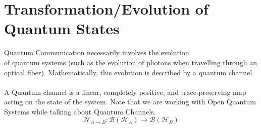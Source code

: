 \documentclass{article}
\begin{document}
\section{Transformation/Evolution of Quantum States}

Quantum Communication necessarily involves the evolution \\
of quantum systems (such as the evolution of photons when travelling through
an optical fiber). Mathematically, this evolution is described by a
quantum channel.
\\
\\
A Quantum channel is a linear, completely positive, and trace-preserving map acting on the state of the system. Note that we are working with Open Quantum Systems while talking about Quantum Channels.
\\
\[\mathcal{N}_{A \rightarrow B} : \mathcal{B}(\mathcal{H}_{A}) \rightarrow \mathcal{B}(\mathcal{H}_{B})\]
\end{document}
